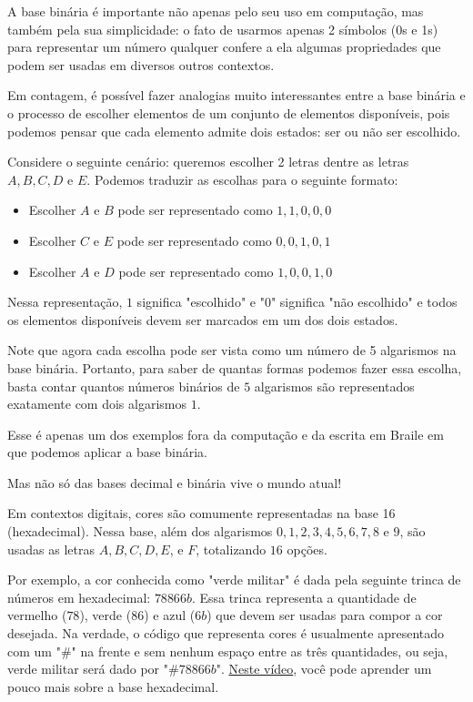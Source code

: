 \label{comp-arr6}

A base binária é importante não apenas pelo seu uso em computação, mas também pela sua simplicidade: o fato de usarmos apenas 2 símbolos (0s e 1s) para representar um número qualquer confere a ela algumas propriedades que podem ser usadas em diversos outros contextos.

Em contagem, é possível fazer analogias muito interessantes entre a base binária e o processo de escolher  elementos de um conjunto de  elementos disponíveis, pois podemos pensar que cada elemento admite dois estados: ser ou não ser escolhido.

Considere o seguinte cenário: queremos escolher 2 letras dentre as letras $A, B, C, D \text{ e } E$. Podemos traduzir as escolhas para o seguinte formato:

\begin{itemize}
\item Escolher $A$ e $B$ pode ser representado como $1,1,0,0,0$
\item Escolher $C$ e $E$ pode ser representado como $0,0,1,0,1$
\item Escolher $A$ e $D$ pode ser representado como $1,0,0,1,0$
\end{itemize}

Nessa representação, $1$ significa "escolhido"{} e "$0$"{} significa "não escolhido"{} e todos os elementos disponíveis devem ser marcados em um dos dois estados.

Note que agora cada escolha pode ser vista como um número de 5 algarismos na base binária. Portanto, para saber de quantas formas podemos fazer essa escolha, basta contar quantos números binários de $5$ algarismos são representados exatamente com dois algarismos $1$.

Esse é apenas um dos exemplos fora da computação e da escrita em Braile em que podemos aplicar a base binária.


\label{comp-know4}

Mas não só das bases decimal e binária vive o mundo atual!

Em contextos digitais, cores são comumente representadas na base 16 (hexadecimal). Nessa base, além dos algarismos $0, 1, 2, 3, 4, 5, 6, 7, 8$ e $9$, são usadas as letras $A, B, C, D, E$, e $F$, totalizando $16$ opções.

Por exemplo, a cor conhecida como "verde militar"{} é dada pela seguinte trinca de números em hexadecimal: $78 86 6b$. Essa trinca representa a quantidade de vermelho ($78$), verde ($86$) e azul ($6b$) que devem ser usadas para compor a cor desejada. Na verdade, o código que representa cores é usualmente apresentado com um "\#"{} na frente e sem nenhum espaço entre as três quantidades, ou seja, verde militar será dado por "$\#78866b$". \href{https://www.youtube.com/watch?v=uuUzkqSxCz4}{Neste vídeo}, você pode aprender um pouco mais sobre a base hexadecimal.

